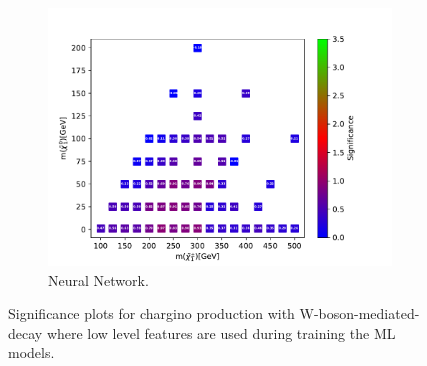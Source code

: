 \begin{figure}[H]
    \begin{subfigure}[t!]{0.49\textwidth}
    \includegraphics[width = \textwidth]{Figures/Significances/significance_NN_WW_Low_level.pdf}
    \caption{Neural Network.}
        \label{fig:signLowWWNN}
    \end{subfigure}
    \caption{Significance plots for chargino production with W-boson-mediated-decay where low level features are used during training the ML models.}
    \label{fig:signLowWW}
\end{figure}

